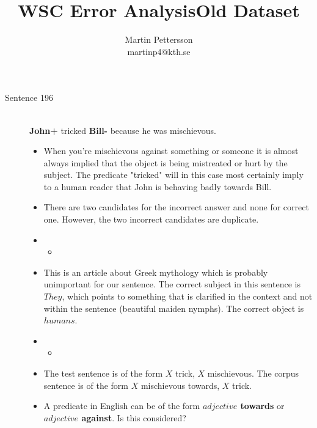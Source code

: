 \documentclass{scrartcl}
\newcommand{\insertcode}[2]{\begin{itemize}\item[]\end{itemize}} %
\begin{document}
\title{WSC Error Analysis}
\author{Martin Pettersson\\martinp4@kth.se}
\maketitle


\begin{center}
	\title{{\large Old Dataset}}
\end{center}

\begin{description}
  \item[Sentence 196] \hfill \\
  {\bf John+} tricked {\bf Bill-} because he was mischievous.
  \begin{itemize}
  	\item When you're mischievous against something or someone it is almost always implied that the object is being mistreated or hurt by the subject. The predicate "tricked" will in this case most certainly imply to a human reader that John is behaving badly towards Bill.
  	\item There are two candidates for the incorrect answer and none for correct one. However, the two incorrect candidates are duplicate.
  	\item \insertcode{"Scripts/196/196-1.sentence"}{Context for $R_1$ and $R_2$ (duplicates).}
  	\item This is an article about Greek mythology which is probably unimportant for our sentence. The correct subject in this sentence is $They$, which points to something that is clarified in the context and not within the sentence (beautiful maiden nymphs). The correct object is $humans$. 
  	\item \insertcode{"Scripts/196/196-2.sentence"}{Target sentence in $R_1$ and $R_2$.}
  	\item The test sentence is of the form $X$ trick, $X$ mischievous. The corpus sentence is of the form $X$ mischievous towards, $X$ trick.
  	\item A predicate in English can be of the form {\bf $adjective$ towards} or {\bf $adjective$ against}. Is this considered?
  \end{itemize}


\end{description}
\end{document}
